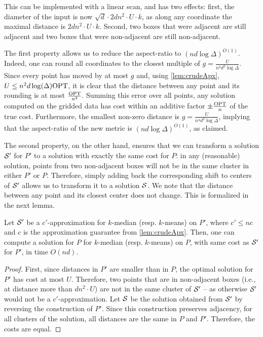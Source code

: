 This can be implemented with a linear scan, and has two effects: first, the diameter of the input is now $\sqrt{d} \cdot 2d n^2\cdot U \cdot k$, as along any
coordinate the maximal distance is $2d n^2\cdot U \cdot k$. Second, two boxes that were adjacent are still adjacent and two boxes that were non-adjacent are
still non-adjacent.

The first property allows us to reduce the aspect-ratio to $(nd \log \Delta)^{O(1)}$.  Indeed, one can round all coordinates to the closest multiple of
$g = \frac{U}{n^4 d^{2} \log \Delta}$. Since every point has moved by at most $g$ and, using \cref{lem:crudeApx}, $U
\leq n^2 d \log(\Delta) \text{OPT}$, it is clear that the distance between any point and its rounding is at most $\frac{\text{OPT}}{n^2}$. Summing this error over all points,
any solution computed on the gridded data has cost within an additive factor $\pm \frac{\text{OPT}}{n}$ of the true cost. Furthermore, the smallest
non-zero distance is $g = \frac{U}{n^4 d^{2} \log \Delta}$, implying that the aspect-ratio of the new metric is $(nd \log \Delta)^{O(1)}$,
as claimed.

The second property, on the other hand, ensures that we can transform a solution $\mathcal S'$ for $P'$ to a solution with exactly the same cost for $P$: in any
(reasonable) solution, points from two non-adjacent boxes will not be in the same cluster in either $P'$ or $P$. Therefore, simply adding back the corresponding
shift to centers of $\mathcal S'$ allows us to transform it to a solution $\mathcal S$. We note that the distance between any point and its closest center does not
change. This is formalized in the next lemma.

\begin{lemma}
Let $\mathcal S'$ be a $c'$-approximation for  $k$-median (resp. $k$-means) on $P'$, where $c' \leq nc$ and $c$ is the approximation guarantee from \cref{lem:crudeApx}. Then, one can compute a solution for $P$ for $k$-median (resp. $k$-means) on $P$, with same cost as $\mathcal S'$ for $P'$, in time $O(nd)$.
\end{lemma}
\begin{proof}

First, since distances in $P'$ are smaller than in $P$, the optimal solution for $P'$ has cost at most $U$. Therefore, two points that are in non-adjacent boxes
(i.e., at distance more than $d n^2\cdot U$) are not in the same cluster of $\mathcal S'$ -- as otherwise $\mathcal S'$ would not be a $c'$-approximation.  Let $\mathcal S$ be
the solution obtained from $\mathcal S'$ by reversing the construction of $P'$. Since this construction preserves adjacency, for all clusters of the solution, all
distances are the same in $P$ and $P'$. Therefore, the costs are equal.

\end{proof}

